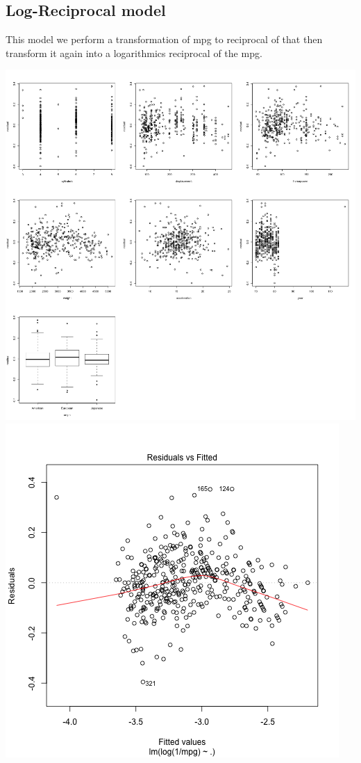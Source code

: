 \documentclass[11pt]{article} %
\begin{document}
\subsection{Log-Reciprocal model}
This model we perform a transformation of mpg to reciprocal of that then transform it again into a logarithmics reciprocal of the mpg.
\begin{center}
\includegraphics[scale=0.13]{5_res_vs_value}
\includegraphics[scale=0.3]{5_res_vs_fitted}
\end{center}
\end{document}
